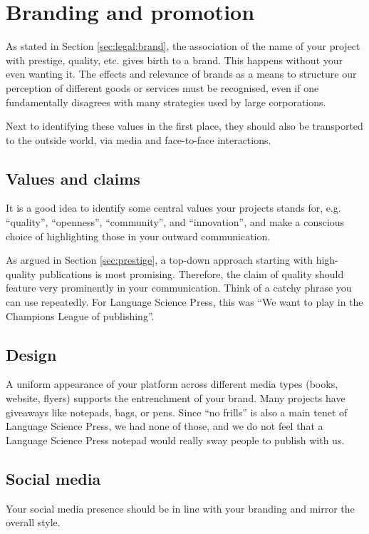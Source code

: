 \documentclass[guidelines,nonflat,modfonts] {langsci/langscibook}
\begin{document}
\section{Branding and promotion}\label{sec:branding}
As stated in Section \ref{sec:legal:brand}, the association of the name of your project with prestige, quality, etc. gives birth to a brand. This happens without your even wanting it. The effects and relevance of brands as a means to structure our perception of different goods or services must be  recognised, even if one  fundamentally disagrees with many strategies used by large corporations. 

Next to identifying these values in the first place, they should also be transported to the outside world, via media and face-to-face interactions. 

\subsection{Values and claims}
It is a good idea to identify some central values your projects stands for, e.g. ``quality'', ``openness'', ``community'', and ``innovation'', and make a conscious choice of highlighting those in your outward communication. 

As argued in Section \ref{sec:prestige}, a top-down approach starting with high-quality publications is most promising. Therefore, the claim of quality should feature very prominently in your communication. Think of a catchy phrase you can use repeatedly. For Language Science Press, this was ``We want to play in the Champions League of publishing''. 

\subsection{Design}
A uniform appearance of your platform across different media types (books, website, flyers) supports the entrenchment of your brand. Many projects have giveaways like notepads, bags, or pens. Since  ``no frills'' is also a main tenet of Language Science Press, we had none of those, and we do not feel that a Language Science Press notepad would really sway people to publish with us. 

\subsection{Social media}
Your social media presence should be in line with your branding and mirror the overall style. 
\end{document}
